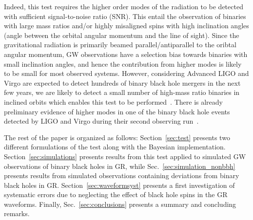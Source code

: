 \documentclass[prd,preprintnumbers,twocolumn,eqsecnum,floatfix,a4paper,nofootinbib,superscriptaddress]{revtex4}
\begin{document}
Indeed, this test requires the higher order modes of the radiation to be detected with sufficient signal-to-noise ratio (SNR). This entail the observation of binaries with large mass ratios and/or highly misaligned spins with high inclination angles (angle between the orbital angular momentum and the line of sight). Since the gravitational radiation is primarily beamed parallel/antiparallel to the oribtal angular momentum, GW observations have a selection bias towards binaries with small inclination angles, and hence the contribution from higher modes is likely to be small for most observed systems. However, considering Advanced LIGO and Virgo are expected to detect hundreds of binary black hole mergers in the next few years, we are likely to detect a small number of high-mass ratio binaries in inclined orbits which enables this test to be performed~\cite{Dhanpal:2018ufk}. There is already preliminary evidence of higher modes in one of the binary black hole events detected by LIGO and Virgo during their second observing run~\cite{Chatziioannou:2019dsz}. 


The rest of the paper is organized as follows: Section~\ref{sec:test} presents two different formulations of the test along with the Bayesian implementation. Section~\ref{sec:simulations} presents results from this test applied to simulated GW observations of binary black holes in GR, while Sec.~\ref{sec:simulation_nonbbh} presents results from simulated observations containing deviations from binary black holes in GR. Section~\ref{sec:waveformsyst} presents a first investigation of systematic errors due to neglecting the effect of black hole spins in the GR waveforms. Finally, Sec.~\ref{sec:conclusions} presents a summary and concluding remarks. 
\end{document}
